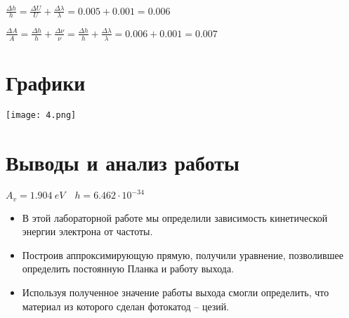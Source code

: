 \documentclass[12pt, a4paper]{article}
\begin{document}
\item $\frac{\Delta h}{h} = \frac{\Delta U}{U} + \frac{\Delta \lambda}{\lambda} = 0.005 + 0.001 = 0.006$
    \item $\frac{\Delta A}{A} = \frac{\Delta h}{h} + \frac{\Delta \nu}{\nu} = \frac{\Delta h}{h} + \frac{\Delta \lambda}{\lambda} = 0.006 + 0.001 = 0.007$

\section{Графики}
\texttt{[image: 4.png]}

\section{Выводы и анализ работы}
$A_{v} = 1.904 \ eV \quad h = 6.462 \cdot 10^{-34}$
\begin{itemize}
    \item В этой лабораторной работе мы определили зависимость кинетической энергии электрона от частоты.
    \item Построив аппроксимирующую прямую, получили уравнение, позволившее определить постоянную Планка и работу выхода.
    \item Используя полученное значение работы выхода смогли определить, что материал из которого сделан фотокатод – цезий.
\end{itemize}
\end{document}
